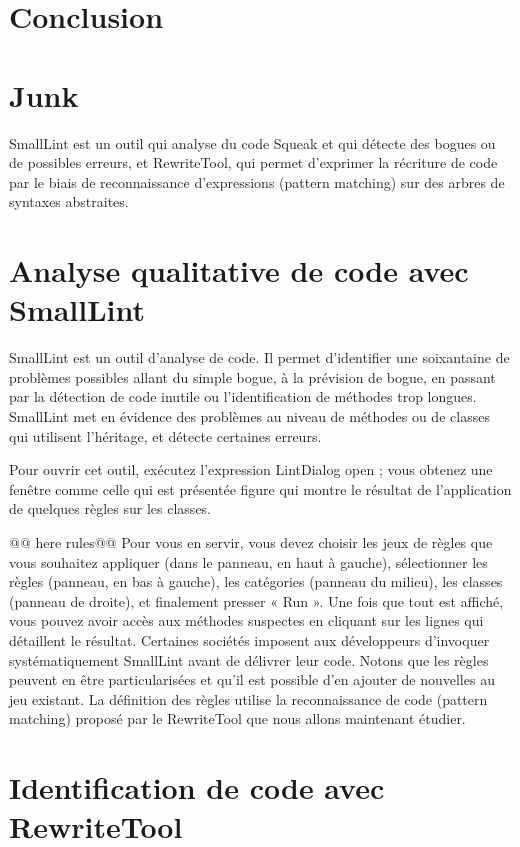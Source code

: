 \documentclass[a4paper,10pt,twoside]{book}
\begin{document}
\section{Conclusion}


\section{Junk}

SmallLint est un outil qui analyse du code Squeak et qui
d\'etecte des bogues ou de possibles erreurs, et RewriteTool, qui permet
d'exprimer la r\'ecriture de code par le biais de reconnaissance
d'expressions (pattern matching) sur des arbres de syntaxes
abstraites. 

\section{ Analyse qualitative de code avec SmallLint}

 SmallLint est un outil d'analyse de code. Il permet d'identifier une soixantaine de
probl\`emes possibles allant du simple bogue, à la pr\'evision de bogue,
en passant par la d\'etection de code inutile ou l'identification de
m\'ethodes trop longues. SmallLint met en \'evidence des probl\`emes au
niveau de m\'ethodes ou de classes qui utilisent l'h\'eritage, et d\'etecte
certaines erreurs.  

Pour ouvrir cet outil, ex\'ecutez l'expression
LintDialog open ; vous obtenez une fenêtre comme celle qui est
pr\'esent\'ee figure  qui montre le r\'esultat de l'application de
quelques r\`egles sur les classes.


@@ here rules@@
 Pour vous en servir,
vous devez choisir les jeux de r\`egles que vous souhaitez appliquer
(dans le panneau, en haut à gauche), s\'electionner les r\`egles (panneau,
en bas à gauche), les cat\'egories (panneau du milieu), les classes
(panneau de droite), et finalement presser « Run ». Une fois que tout
est affich\'e, vous pouvez avoir acc\`es aux m\'ethodes suspectes en
cliquant sur les lignes qui d\'etaillent le r\'esultat.  Certaines
soci\'et\'es imposent aux d\'eveloppeurs d'invoquer syst\'ematiquement
SmallLint avant de d\'elivrer leur code. Notons que les r\`egles peuvent
en être particularis\'ees et qu'il est possible d'en ajouter de
nouvelles au jeu existant. La d\'efinition des r\`egles utilise la
reconnaissance de code (pattern matching) propos\'e par le RewriteTool
que nous allons maintenant \'etudier.

\section{Identification de code avec RewriteTool}
\end{document}
